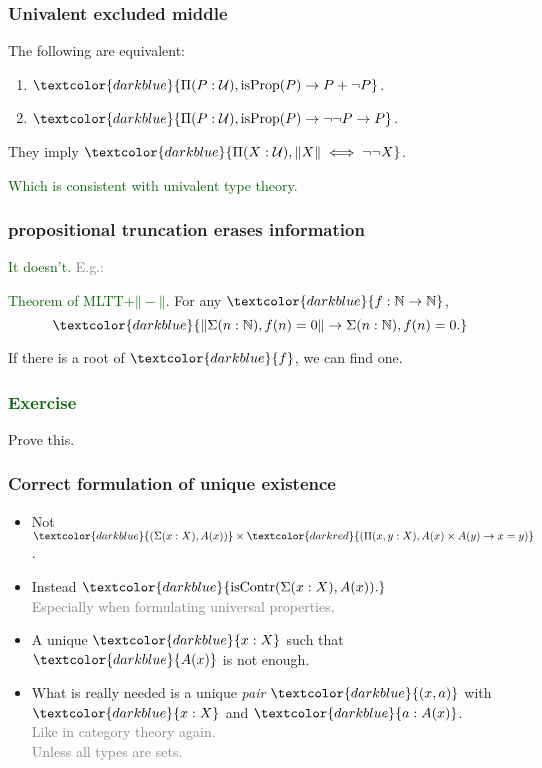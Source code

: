 \documentclass[aspectratio=169]{beamer}
\newcommand{\isProp}{\operatorname{isProp}}
\newcommand{\isContr}{\operatorname{isContr}}
\newcommand{\U}{\operatorname{\mathcal{U}}}
\newcommand{\db}{\textcolor{darkblue}}
\newcommand{\dg}{\textcolor{darkgreen}}
\newcommand{\grey}{\textcolor{grey}}
\newcommand{\dr}{\textcolor{darkred}}
\newcommand{\m}[1]{$\db{#1}$}
\newcommand{\mm}[1]{${#1}$}
\newcommand{\M}[1]{\[\db{#1}\]}
\newcommand{\N}{\mathbb{N}}
\newcommand{\trunc}[1]{{\mathord{\parallel}#1\mathord{\parallel}}}
\begin{document}
\begin{frame}
  \frametitle{Univalent excluded middle}

\vfill

The following are equivalent:
\begin{enumerate}
\vfill \item \m{\Pi(P:\U), \isProp(P) \to P + \neg P}.
\vfill \item \m{\Pi(P:\U), \isProp(P) \to \neg \neg P \to P}.
\end{enumerate}

\vfill

They imply \m{\Pi(X:\U), \trunc{X} \iff \neg\neg X}.

\vfill

\dg{Which is consistent with univalent type theory.}

\end{frame}

\begin{frame}
  \frametitle{\framebox{\dr{Myth:}} propositional truncation erases information}

\vfill

\grey{\dg{It doesn't.} E.g.:}

\vfill

\dg{Theorem of MLTT+$\trunc{-}$}. For any \m{f:\N \to \N},
\M{\trunc{\Sigma(n:\N), f(n)=0} \to \Sigma(n:\N), f(n)=0.}

\vfill

If there is a root of \m{f}, we can find one.

\end{frame}

\begin{frame}
  \frametitle{\dg{Exercise}}

  Prove this.
\end{frame}

\begin{frame}
  \frametitle{Correct formulation of unique existence}

  \begin{itemize}
  \vfill \item
Not \mm{\db{(\Sigma(x:X), A(x))} \times \dr{(\Pi(x,y:X), A(x) \times A(y) \to x=y)}}.
  \vfill \item Instead \m{\isContr(\Sigma(x:X), A(x)).} \\[1ex]

  \grey{Especially when formulating universal properties.}

\vfill \item A unique \m{x:X} such that \m{A(x)} is not enough.

\vfill \item What is really needed is a unique \emph{pair} \m{(x,a)} with \m{x:X} and \m{a:A(x)}. \\[1ex]
\grey{Like in category theory again.} \\[1ex]
\grey{Unless all types are sets.}
  \end{itemize}

\vfill

\end{frame}
\end{document}
